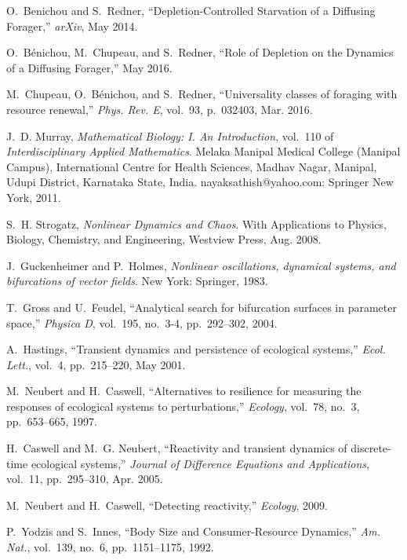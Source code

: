 \documentclass[11pt]{article}
\begin{document}
\begin{multicols}{2}
{\begin{thebibliography}{10}
O.~Benichou and S.~Redner, ``{Depletion-Controlled Starvation of a Diffusing
  Forager},'' {\em arXiv}, May 2014.

O.~B{\'e}nichou, M.~Chupeau, and S.~Redner, ``{Role of Depletion on the
  Dynamics of a Diffusing Forager},'' May 2016.

M.~Chupeau, O.~B{\'e}nichou, and S.~Redner, ``{Universality classes of foraging
  with resource renewal},'' {\em Phys. Rev. E}, vol.~93, p.~032403, Mar. 2016.

J.~D. Murray, {\em {Mathematical Biology: I. An Introduction}}, vol.~110 of
  {\em Interdisciplinary Applied Mathematics}.
\newblock Melaka Manipal Medical College (Manipal Campus), International Centre
  for Health Sciences, Madhav Nagar, Manipal, Udupi District, Karnataka State,
  India. nayaksathish@yahoo.com: Springer New York, 2011.

S.~H. Strogatz, {\em {Nonlinear Dynamics and Chaos}}.
\newblock With Applications to Physics, Biology, Chemistry, and Engineering,
  Westview Press, Aug. 2008.

J.~Guckenheimer and P.~Holmes, {\em {Nonlinear oscillations, dynamical systems,
  and bifurcations of vector fields}}.
\newblock New York: Springer, 1983.

T.~Gross and U.~Feudel, ``{Analytical search for bifurcation surfaces in
  parameter space},'' {\em Physica D}, vol.~195, no.~3-4, pp.~292--302, 2004.

A.~Hastings, ``{Transient dynamics and persistence of ecological systems},''
  {\em Ecol. Lett.}, vol.~4, pp.~215--220, May 2001.

M.~Neubert and H.~Caswell, ``{Alternatives to resilience for measuring the
  responses of ecological systems to perturbations},'' {\em Ecology}, vol.~78,
  no.~3, pp.~653--665, 1997.

H.~Caswell and M.~G. Neubert, ``{Reactivity and transient dynamics of
  discrete-time ecological systems},'' {\em Journal of Difference Equations and
  Applications}, vol.~11, pp.~295--310, Apr. 2005.

M.~Neubert and H.~Caswell, ``{Detecting reactivity},'' {\em Ecology}, 2009.

P.~Yodzis and S.~Innes, ``{Body Size and Consumer-Resource Dynamics},'' {\em
  Am. Nat.}, vol.~139, no.~6, pp.~1151--1175, 1992.


\end{thebibliography}}
\end{multicols}
\end{document}
